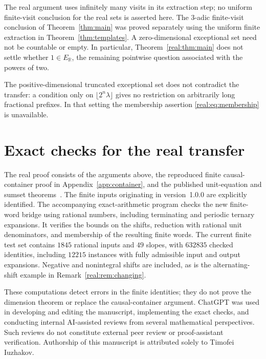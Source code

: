 \documentclass[11pt]{article}
\theoremstyle{definition}
\theoremstyle{remark}
\newcommand{\R}{\mathbb R}
\newcommand{\ER}{E_{\R}}
\begin{document}
The real argument uses infinitely many visits in its extraction step;
no uniform finite-visit conclusion for the real sets is asserted here.
The $3$-adic finite-visit conclusion of Theorem~\ref{thm:main} was proved
separately using the uniform finite extraction in
Theorem~\ref{thm:templates}. A zero-dimensional exceptional set need
not be countable or empty. In particular, Theorem~\ref{real:thm:main}
does not settle whether $1\in\ER$, the remaining pointwise question
associated with the powers of two.

The positive-dimensional truncated exceptional set does not contradict
the transfer: a condition only on $\lfloor2^n\lambda\rfloor$ gives no
restriction on arbitrarily long fractional prefixes. In that setting
the membership assertion \eqref{real:eq:membership} is unavailable.

\section{Exact checks for the real transfer}
The real proof consists of the arguments above, the reproduced finite
causal-container proof in Appendix~\ref{app:container}, and the
published unit-equation and sumset theorems~\cite{ESS,DeVos}.
The finite inputs originating in version~1.0.0 are explicitly identified. The accompanying
exact-arithmetic program checks the new finite-word bridge using
rational numbers, including terminating and periodic ternary expansions.
It verifies the bounds on the shifts, reduction with rational unit
denominators, and membership of the resulting finite words. The current
finite test set contains $1845$ rational inputs and $49$ slopes, with
$632835$ checked identities, including $12215$ instances with fully
admissible input and output expansions. Negative and nonintegral shifts
are included, as is the alternating-shift example in
Remark~\ref{real:rem:changing}.

These computations detect errors in the finite identities; they do not
prove the dimension theorem or replace the causal-container argument.
ChatGPT was used in developing and editing the manuscript, implementing
the exact checks, and conducting internal AI-assisted reviews from
several mathematical perspectives. Such reviews do not constitute
external peer review or proof-assistant verification. Authorship of this
manuscript is attributed solely to Timofei Iuzhakov.







\end{document}

